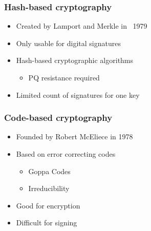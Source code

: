 			\begin{frame}
				\frametitle{Hash-based cryptography}
				\begin{itemize}
					\item Created by Lamport and Merkle in ~1979
					\item Only usable for digital signatures
					
					\item Hash-based cryptographic algorithms
					\begin{itemize}
						\item PQ resistance required
					\end{itemize}

					\item Limited count of signatures for one key

					
				\end{itemize}
				
			\end{frame}
			
			\begin{frame}
				\frametitle{Code-based cryptography}
				\begin{itemize}
					\item Founded by Robert McEliece in 1978
					\item Based on error correcting codes
					\begin{itemize}
						\item Goppa Codes
						\item Irreducibility
					\end{itemize}
					\item Good for encryption
					\item Difficult for signing
				\end{itemize}
			\end{frame}
	
	